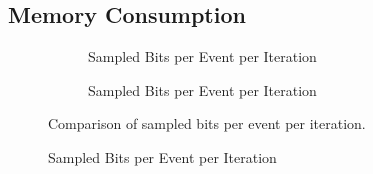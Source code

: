\subsection{Memory Consumption}


\begin{landscape}
\begin{figure}[h!]
    \centering
    \begin{subfigure}[t]{0.664\textwidth}
        \centering
        
        \caption{Sampled Bits per Event per Iteration}
        \label{fig:canopy_rel_error_plot_1}
    \end{subfigure}
    \hfill
    \begin{subfigure}[t]{0.66\textwidth}
        \centering
        
        \caption{Sampled Bits per Event per Iteration}
        \label{fig:canopy_rel_error_plot_2}
    \end{subfigure}
    \caption{Comparison of sampled bits per event per iteration.}
\end{figure}
\end{landscape}

\begin{figure}[h!]
    
    \caption{Sampled Bits per Event per Iteration}
    \label{fig: canopy_rel_error_plot}
\end{figure}